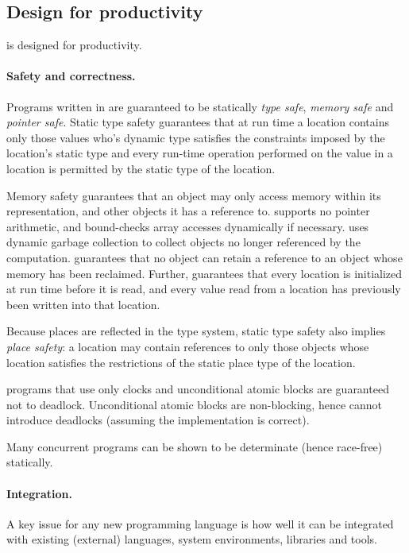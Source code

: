 \subsection{Design for productivity}
\Xten{} is designed for productivity. 

\paragraph{Safety and correctness.} 
Programs written in \Xten{} are guaranteed to be statically
\emph{type safe}, \emph{memory safe} and \emph{pointer safe}. Static type safety
guarantees that at run time a location contains only those values who's
dynamic type satisfies the constraints imposed by the location's
static type and every run-time operation performed on the value in a
location is permitted by the static type of the location.

Memory safety guarantees that an object may only access memory within
its representation, and other objects it has a reference to. \Xten{}
supports no pointer arithmetic, and bound-checks array accesses
dynamically if necessary. \Xten{} uses dynamic garbage collection to
collect objects no longer referenced by the computation. \Xten{}
guarantees that no object can retain a reference to an object
whose memory has been reclaimed.  Further, \Xten{} guarantees that
every location is initialized at run time before it is read, 
and every value read from a location has previously been written into
that location. 


Because places are reflected in the type system, static type safety
also implies \emph{place safety}: a location may contain references to only
those objects whose location satisfies the restrictions of the static
place type of the location.

\Xten{} programs that use only clocks and unconditional atomic
blocks are guaranteed not to deadlock. Unconditional atomic blocks
are non-blocking, hence cannot introduce deadlocks (assuming the
implementation is correct).

Many concurrent programs can be shown to be determinate (hence
race-free) statically.

\paragraph{Integration.}
A key issue for any new programming language is how well it can be
integrated with existing (external) languages, system environments,
libraries and tools.

